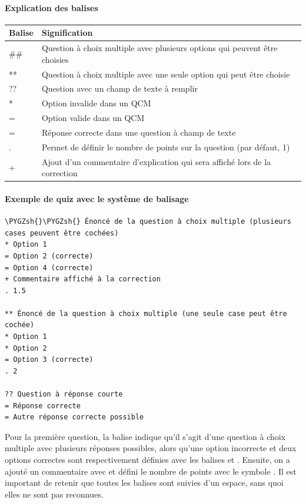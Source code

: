 \documentclass[a4,10pt,french]{sphinxmanual}
\def\PYGZsh{\char`\#}
\begin{document}
\paragraph{Explication des balises}
\label{doc-user:explication-des-balises}
\begin{tabulary}{\linewidth}{|L|L|}
\hline
\textsf{\relax 
Balise
} & \textsf{\relax 
Signification
}\\
\hline
\#\#
 & 
Question à choix multiple avec plusieurs options qui peuvent être choisies
\\
\hline
**
 & 
Question à choix multiple avec une seule option qui peut être choisie
\\
\hline
??
 & 
Question avec un champ de texte à remplir
\\
\hline
*
 & 
Option invalide dans un QCM
\\
\hline
=
 & 
Option valide dans un QCM
\\
\hline
=
 & 
Réponse correcte dans une question à champ de texte
\\
\hline
.
 & 
Permet de définir le nombre de points sur la question (par défaut, 1)
\\
\hline
+
 & 
Ajout d'un commentaire d'explication qui sera affiché lors de la correction
\\
\hline\end{tabulary}



\paragraph{Exemple de quiz avec le système de balisage}
\label{doc-user:exemple-de-quiz-avec-le-systeme-de-balisage}
\begin{Verbatim}[commandchars=\\\{\}]
\PYGZsh{}\PYGZsh{} Énoncé de la question à choix multiple (plusieurs cases peuvent être cochées)
* Option 1
= Option 2 (correcte)
= Option 4 (correcte)
+ Commentaire affiché à la correction
. 1.5

** Énoncé de la question à choix multiple (une seule case peut être cochée)
* Option 1
* Option 2
= Option 3 (correcte)
. 2

?? Question à réponse courte
= Réponse correcte
= Autre réponse correcte possible
\end{Verbatim}

Pour la première question, la balise \code{\#\#} indique qu'il s'agit d'une question à choix multiple avec plusieurs réponses possibles, alors qu'une option incorrecte et deux options correctes sont respectivement définies avec les balises \code{*} et \code{=}. Ensuite, on a ajouté un commentaire avec \code{+} et défini le nombre de points avec le symbole . Il est important de retenir que toutes les balises sont suivies d'un espace, sans quoi elles ne sont pas reconnues.
\end{document}
